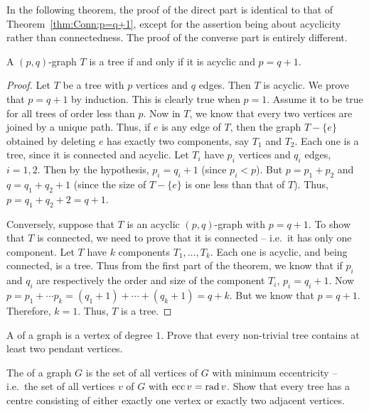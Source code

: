 In the following theorem, the proof of the direct part is identical to that of Theorem~\ref{thm:Conn;p=q+1}, except for the assertion being about acyclicity rather than connectedness. The proof of the converse part is entirely different.
\begin{Theorem}\label{thm:Acyc;p=q+1}
A $(p,q)$-graph $T$ is a tree if and only if it is acyclic and $p = q + 1$.
\end{Theorem}
\begin{proof}
Let $T$ be a tree with $p$ vertices and $q$ edges. Then $T$ is acyclic. We prove that $p = q + 1$ by induction. This is clearly true when $p = 1$. Assume it to be true for all trees of order less than $p$. Now in $T$, we know that every two vertices are joined by a unique path. Thus, if $e$ is any edge of $T$, then the graph $T - \{e\}$ obtained by deleting $e$ has exactly two components, say $T_1$ and $T_2$. Each one is a tree, since it is connected and acyclic. Let $T_i$ have $p_i$ vertices and $q_i$ edges, $i = 1, 2$. Then by the hypothesis, $p_i = q_i + 1$ (since $p_i < p$). But $p = p_1 + p_2$ and $q = q_1 + q_2 + 1$ (since the size of $T - \{e\}$ is one less than that of $T$). Thus, $p = q_1 + q_2 + 2 = q + 1$.

Conversely, suppose that $T$ is an acyclic $(p,q)$-graph with $p = q + 1$. To show that $T$ is connected, we need to prove that it is connected -- i.e.\ it has only one component. Let $T$ have $k$ components $T_1, \ldots, T_k$. Each one is acyclic, and being connected, is a tree. Thus from the first part of the theorem, we know that if $p_i$ and $q_i$ are respectively the order and size of the component $T_i$, $p_i = q_i + 1$. Now $p = p_1 + \cdots p_k = (q_1 + 1) + \cdots + (q_k + 1) = q + k$. But we know that $p = q + 1$. Therefore, $k = 1$. Thus, $T$ is a tree.
\end{proof}

\begin{Exercise}\label{exer:TreePendantVertices}
A  of a graph is a vertex of degree $1$. Prove that every non-trivial tree contains at least two pendant vertices. \\
\end{Exercise}

\begin{Exercise}\label{exer:TreeCentre}
The  of a graph $G$ is the set of all vertices of $G$ with minimum eccentricity -- i.e.\ the set of all vertices $v$ of $G$ with $\operatorname{ecc} v = \operatorname{rad} v$. Show that every tree has a centre consisting of either exactly one vertex or exactly two adjacent vertices.\\
\end{Exercise}


